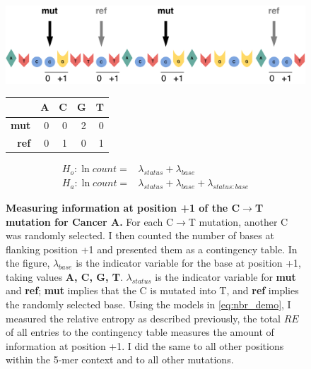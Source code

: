 \begin{figure}[h!]
  \begin{minipage}[c]{\textwidth}
    \includegraphics[width=\textwidth]{graphics/flank_demo.pdf}
  \end{minipage}\hfill
  \vspace{1cm}
  
  \begin{minipage}[c]{0.48\textwidth}
  \centering
    \begin{tabulary}{\columnwidth}{rRRRR}
    \toprule
        & \textbf{A} & \textbf{C} & \textbf{G} & \textbf{T}  \\
    \hline
        \textbf{mut} & 0 & 0 & 2 & 0  \\
        \textbf{ref} & 0 & 1 & 0 & 1  \\
    \bottomrule
    \end{tabulary}
  \end{minipage}\hfill
  \begin{minipage}[c]{0.48\textwidth}
    \begin{equation}
        \begin{aligned}
            H_o: \ln{count} =& \lambda_{status} + \lambda_{base} \\
            H_a: \ln{count} =& \lambda_{status} + \lambda_{base} + \lambda_{status:base}
        \end{aligned}
        \label{eq:nbr_demo}
    \end{equation}
  \end{minipage}
  \vspace{0.5cm}
  
  \begin{minipage}[c]{\textwidth}
    \caption{
      \textbf{Measuring information at position +1 of the C$\rightarrow$T mutation for Cancer A.} For each C$\rightarrow$T mutation, another C was randomly selected. I then counted the number of bases at flanking position +1 and presented them as a contingency table. In the figure, $\lambda_{base}$ is the indicator variable for the base at position +1, taking values \textbf{A, C, G, T}. $\lambda_{status}$ is the indicator variable for \textbf{mut} and \textbf{ref}; \textbf{mut} implies that the C is mutated into T, and \textbf{ref} implies the randomly selected base. Using the models in \ref{eq:nbr_demo}, I measured the relative entropy as described previously, the total $RE$ of all entries to the contingency table measures the amount of information at position +1. I did the same to all other positions within the 5-mer context and to all other mutations.
    } \label{fig:nbr_demo}
  \end{minipage}
\end{figure}
